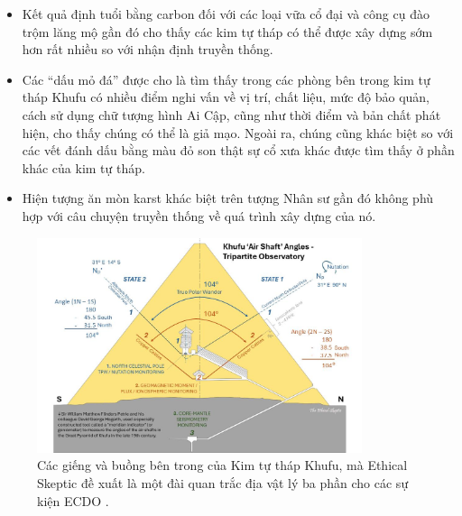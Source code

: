 \documentclass[10pt,twocolumn,letterpaper]{article}
\begin{document}
\begin{flushleft}
\begin{itemize}
    \item Kết quả định tuổi bằng carbon đối với các loại vữa cổ đại và công cụ đào trộm lăng mộ gần đó cho thấy các kim tự tháp có thể được xây dựng sớm hơn rất nhiều so với nhận định truyền thống.
    \item Các “dấu mỏ đá” được cho là tìm thấy trong các phòng bên trong kim tự tháp Khufu có nhiều điểm nghi vấn về vị trí, chất liệu, mức độ bảo quản, cách sử dụng chữ tượng hình Ai Cập, cũng như thời điểm và bản chất phát hiện, cho thấy chúng có thể là giả mạo. Ngoài ra, chúng cũng khác biệt so với các vết đánh dấu bằng màu đỏ son thật sự cổ xưa khác được tìm thấy ở phần khác của kim tự tháp.
    \item Hiện tượng ăn mòn karst khác biệt trên tượng Nhân sư gần đó không phù hợp với câu chuyện truyền thống về quá trình xây dựng của nó.
\end{itemize}
\end{flushleft}
\begin{figure}[b]
\begin{center}
\includegraphics[width=0.85\textwidth]{shafts.jpg}
\end{center}
   \caption{Các giếng và buồng bên trong của Kim tự tháp Khufu, mà Ethical Skeptic đề xuất là một đài quan trắc địa vật lý ba phần cho các sự kiện ECDO \cite{28}.}
\label{fig:5}
\end{figure}
\end{document}
